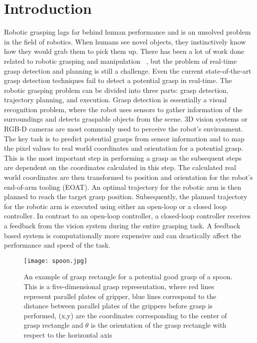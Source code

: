 \documentclass[10pt,twocolumn,letterpaper]{article}
\begin{document}
\section{Introduction}
Robotic grasping lags far behind human performance and is an unsolved problem in the field of robotics. When humans see novel objects, they instinctively know how they would grab them to pick them up. There has been a lot of work done related to robotic grasping and manipulation ~\cite{Ciocarlie2014,Redmon,saxena2008robotic}, but the problem of real-time grasp detection and planning is still a challenge. Even the current state-of-the-art grasp detection techniques fail to detect a potential grasp in real-time. The robotic grasping problem can be divided into three parts: grasp detection, trajectory planning, and execution. Grasp detection is essentially a visual recognition problem, where the robot uses sensors to gather information of the surroundings and detects graspable objects from the scene. 3D vision systems or RGB-D cameras are most commonly used to perceive the robot's environment. The key task is to predict potential grasps from sensor information and to map the pixel values to real world coordinates and orientation for a potential grasp. This is the most important step in performing a grasp as the subsequent steps are dependent on the coordinates calculated in this step. The calculated real world coordinates are then transformed to position and orientation for the robot's end-of-arm tooling (EOAT). An optimal trajectory for the robotic arm is then planned to reach the target grasp position. Subsequently, the planned trajectory for the robotic arm is  executed using either an open-loop or a closed loop controller. In contrast to an open-loop controller, a closed-loop controller receives a feedback from the vision system during the entire grasping task. A feedback based system is computationally more expensive and can drastically affect the performance and speed of the task. 

\begin{figure}
\begin{center}
\texttt{[image: spoon.jpg]}
\end{center}
   \caption{An example of grasp rectangle for a potential good grasp of a spoon. This is a five-dimensional grasp representation, where red lines represent parallel plates of gripper, blue lines correspond to the distance between parallel plates of the grippers before grasp is performed, (x,y) are the coordinates corresponding to the center of grasp rectangle and $\theta$ is the orientation of the grasp rectangle with respect to the horizontal axis}
\label{fig:rit_mug}
\end{figure}
\end{document}
